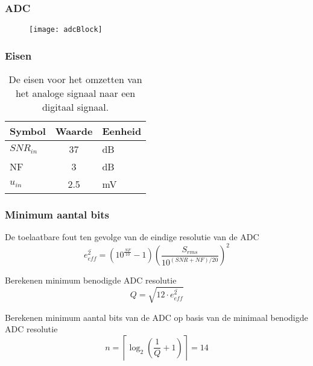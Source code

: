 \begin{frame}
    \frametitle{ADC}
    
    \begin{figure}
        \centering
        \texttt{[image: adcBlock]}
    \end{figure}

\end{frame}

\begin{frame}
    \frametitle{Eisen}

    \begin{table}[ht]
        \centering
        \begin{tabular}{l|c|l}
            Symbol      & Waarde & Eenheid\\\hline
            $SNR_{in}$  & 37        & dB\\
            NF          & 3         & dB\\
            $u_{in}$    & 2.5       & mV\\
        \end{tabular}
        \caption{De eisen voor het omzetten van het analoge signaal naar een digitaal signaal.}
        \label{tab:systemSpecADC}
    \end{table}
    
\end{frame}
\begin{frame}
    \frametitle{Minimum aantal bits}
    \centering

    De toelaatbare fout ten gevolge van de eindige resolutie van de ADC
    \begin{equation*}\label{eq:calcSpecifiedRmsError}
        \overline{e_{eff}^2}=\left(10^{\frac{NF}{10}}-1\right)\left(\frac{S_{rms}}{10^{\left(SNR+NF\right)/20}}\right)^2
    \end{equation*}
    \pause


    Berekenen minimum benodigde ADC resolutie
    \begin{equation*}\label{eq:calcNeededQ}
        Q=\sqrt{12\cdot\overline{e_{eff}^2}}
    \end{equation*}
    \pause

    Berekenen minimum aantal bits van de ADC op basis van de minimaal benodigde ADC resolutie 
    \begin{equation*}\label{eq:calcMinNumberADCbits}
        n=\left\lceil\log_2\left(\frac{1}{Q}+1\right)\right\rceil=14
    \end{equation*}

\end{frame}

